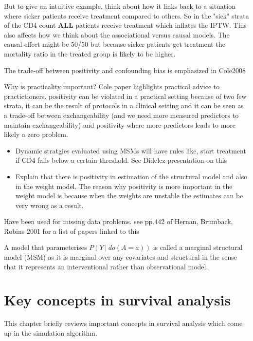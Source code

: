 \documentclass[11pt]{article}
\providecommand{\tightlist}{%
      \setlength{\itemsep}{0pt}\setlength{\parskip}{0pt}}
\begin{document}
But to give an intuitive example, think about how it links back to a
situation where sicker patients receive treatment compared to others. So
in the "sick" strata of the CD4 count \textbf{ALL} patients receive
treatment which inflates the IPTW. This also affects how we think about
the associational versus causal models. The causal effect might be 50/50
but because sicker patients get treatment the mortality ratio in the
treated group is likely to be higher.

The trade-off between positivity and confounding bias is emphasized in
Cole2008

Why is practicality important? Cole paper highlights practical advice to
practictioners. positivity can be violated in a practical setting
because of two few strata, it can be the result of protocols in a
clinical setting and it can be seen as a trade-off between
exchangeability (and we need more measured predictors to maintain
exchangeability) and positivity where more predictors leads to more
likely a zero problem.

\begin{itemize}
\tightlist
\item
  Dynamic stratgies evaluated using MSMs will have rules like, start
  treatment if CD4 falls below a certain threshold. See Didelez
  presentation on this
\item
  Explain that there is positivity in estimation of the structural model
  and also in the weight model. The reason why positivity is more
  important in the weight model is because when the weights are unstable
  the estimates can be very wrong as a result.
\end{itemize}

    Have been used for missing data problems. see pp.442 of Hernan,
Brumback, Robins 2001 for a list of papers linked to this

A model that parameterises \(P(Y\ |\ do(A=a))\) is called a marginal
structural model (MSM) as it is marginal over any covariates and
structural in the sense that it represents an interventional rather than
observational model.

    \newpage

    \section{Key concepts in survival
analysis}\label{key-concepts-in-survival-analysis}

This chapter briefly reviews important concepts in survival analysis
which come up in the simulation algorithm.
\end{document}
